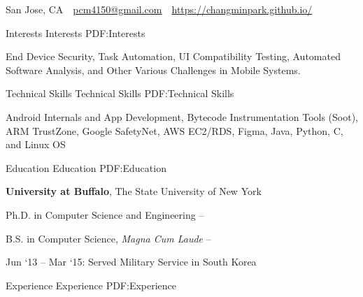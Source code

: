 \documentclass[letterpaper,MMMyyyy,nonstopmode]{simpleresumecv}
\newcommand{\CVAuthor}{Chang Min Park}
\newcommand{\CVWebpage}{https://changminpark.github.io/}
\begin{document}

\Title{\CVAuthor}

\vspace{0.5ex}
\begin{SubTitle}
San Jose, CA
\,\SubBulletSymbol\,
\href{mailto:pcm4150@gmail.com}
{pcm4150@gmail.com}
\,\SubBulletSymbol\,
\href{\CVWebpage}
{\url{\CVWebpage}}
\end{SubTitle}

\begin{Body}

\vspace{-1ex}
\Section
{Interests}
{Interests}
{PDF:Interests}

\Entry
End Device Security, Task Automation, UI Compatibility Testing, 
Automated Software Analysis, and Other Various Challenges in Mobile Systems.

\vspace{-0.8ex}
\Section
{Technical Skills}
{Technical Skills}
{PDF:Technical Skills}

\Entry
Android Internals and App Development, Bytecode Instrumentation Tools (Soot),
ARM TrustZone, Google SafetyNet, AWS EC2/RDS, Figma, Java, Python, C, and Linux OS

\vspace{-0.8ex}
\Section
{Education}
{Education}
{PDF:Education}

\Entry
\textbf{University at Buffalo}, The State University of New York

\Gap
\BulletItem
Ph.D. in Computer Science and Engineering
\hfill
{} --

\Gap
\BulletItem
B.S. in Computer Science, \textit{Magna Cum Laude}
\hfill
{} --
\begin{Detail}
\SubBulletItem
Jun `13 -- Mar `15: Served Military Service in South Korea
\end{Detail}



\vspace{-0.8ex}
\Section
{Experience}
{Experience}
{PDF:Experience}



\end{Body}
\end{document}
